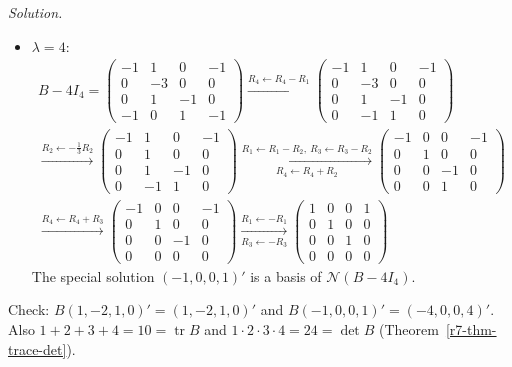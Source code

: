 \documentclass[12pt]{article}
\DeclareMathOperator{\tr}{tr}
\theoremstyle{definition}
\newenvironment{solution}{\par\noindent\textit{Solution.}\ }{\par\smallskip}
\begin{document}
\begin{solution}
\begin{itemize}
\[\begin{gathered}
\begin{pmatrix}1&0&-1&0\\0&1&0&0\\0&0&0&1\\0&0&0&0\end{pmatrix}
\end{gathered}
\]
The special solution \((1,0,1,0)'\) is a basis of \(\mathcal N(B-3I_4)\).
\item \(\lambda=4\):
\[
\begin{gathered}
B-4I_4=\begin{pmatrix}-1&1&0&-1\\0&-3&0&0\\0&1&-1&0\\-1&0&1&-1\end{pmatrix}
\xrightarrow{R_4\leftarrow R_4-R_1}
\begin{pmatrix}-1&1&0&-1\\0&-3&0&0\\0&1&-1&0\\0&-1&1&0\end{pmatrix}
\\
\xrightarrow{R_2\leftarrow-\frac13R_2}
\begin{pmatrix}-1&1&0&-1\\0&1&0&0\\0&1&-1&0\\0&-1&1&0\end{pmatrix}
\xrightarrow[R_4\leftarrow R_4+R_2]{R_1\leftarrow R_1-R_2,\ R_3\leftarrow R_3-R_2}
\begin{pmatrix}-1&0&0&-1\\0&1&0&0\\0&0&-1&0\\0&0&1&0\end{pmatrix}
\\
\xrightarrow{R_4\leftarrow R_4+R_3}
\begin{pmatrix}-1&0&0&-1\\0&1&0&0\\0&0&-1&0\\0&0&0&0\end{pmatrix}
\xrightarrow[R_3\leftarrow-R_3]{R_1\leftarrow-R_1}
\begin{pmatrix}1&0&0&1\\0&1&0&0\\0&0&1&0\\0&0&0&0\end{pmatrix}
\end{gathered}
\]
The special solution \((-1,0,0,1)'\) is a basis of \(\mathcal N(B-4I_4)\).
\end{itemize}
Check: \(B(1,-2,1,0)'=(1,-2,1,0)'\) and \(B(-1,0,0,1)'=(-4,0,0,4)'\). Also \(1+2+3+4=10=\tr B\) and
\(1\cdot2\cdot3\cdot4=24=\det B\) (Theorem~\ref{r7-thm-trace-det}).
\end{solution}
\end{document}
